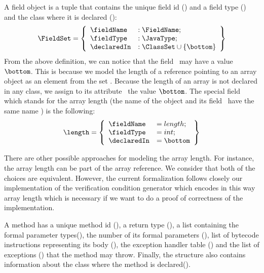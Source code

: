  A field object is a tuple that contains the unique field id (\fieldName) and a field type (\fieldType) and
 the class where it is declared (\declaredIn):  
 $$ \begin{array}{l}
         \FieldSet = \left\{\begin{array}{ll}   
		                               \fieldName  &  : \FieldName;\\
                                               \fieldType   &  : \JavaType; \\
					       \declaredIn  &  : \ClassSet \cup \{ \bottom \}
                     \end{array} \right\}
   \end{array} $$
  From the above definition, we can notice that the field \declaredIn \ may have a value $\bottom$. This is because we model 
  the length of a reference pointing to an array object as an element from the set \FieldSet. Because the length of 
  an array is not declared in any class, 
  we assign to its attribute \declaredIn \ the value $\bottom$.  
  The special field which stands for the array length  
 (the name of the object and its field  \fieldName \ have the same name ) is the following:
 $$  \length =  \left\{\begin{array}{ll} \fieldName & = length;\\
			                 \fieldType  & = int; \\
					 \declaredIn & = \bottom
                     \end{array} \right\}$$

 There are other possible approaches for modeling the array length. For instance,
 the array length can be part of the array reference. We consider that both of the choices are equivalent.
 However, the current formalization follows closely our implementation  of the verification condition 
 generator which encodes in this way array length which is necessary if we want to do a proof of correctness of the implementation.


 A method has a unique method id (\methodName), a return type (\retType),
 a list containing the formal parameter types(\args), 
 the number of its formal parameters (\numArgs),
 list of bytecode instructions representing its body (\body),
 the exception handler table (\excHandlerTable) and the list of exceptions
 (\exceptions) that the method may throw. Finally, the structure also contains information 
 about the class where the method is declared(\declaredIn). 

